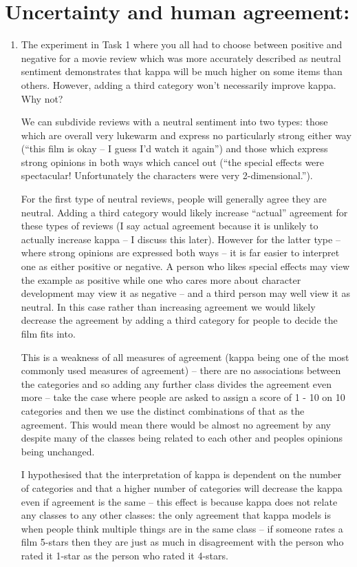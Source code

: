 \documentclass[10pt,\jkfside,a4paper]{article}
\begin{document}
\section*{Uncertainty and human agreement:}

\begin{enumerate}

\item The experiment in Task 1 where you all had to choose between positive
and negative for a movie review which was more accurately described as
neutral sentiment demonstrates that kappa will be much higher on some
items than others. However, adding a third category won’t necessarily
improve kappa. Why not?

We can subdivide reviews with a neutral sentiment into two types: those which are overall 
very lukewarm and express no particularly strong either way (``this film is okay -- I guess 
I'd watch it again'') and those which express strong opinions in both ways which cancel 
out (``the special effects were spectacular! Unfortunately the characters were 
very 2-dimensional.'').

For the first type of neutral reviews, people will generally agree they are neutral. Adding a 
third category would likely increase ``actual'' agreement for these types of reviews (I say 
actual agreement because it is unlikely to actually increase kappa -- I discuss this later). 
However for the latter type -- where strong opinions are expressed both ways -- it is far easier 
to interpret one as either positive or negative. A person who likes special effects may view 
the example as positive while one who cares more about character development may view it 
as negative -- and a third person may well view it as neutral. In this case rather than 
increasing agreement we would likely decrease the agreement by adding a third category for 
people to decide the film fits into.

This is a weakness of all measures of agreement (kappa being one of the most commonly used 
measures of agreement) -- there are no associations between the 
categories and so adding any further class divides the agreement even more -- take the 
case where people are asked to assign a score of 1 - 10 on 10 categories and then we use 
the distinct combinations of that as the agreement. This would mean there would be almost no 
agreement by any despite many of the classes being related to each other and peoples opinions 
being unchanged.

I hypothesised that the interpretation of kappa is dependent on the number of categories 
and that a higher number of categories will decrease the kappa even if agreement is the same 
-- this effect is because kappa does not relate any classes to any other classes: the only 
agreement that kappa models is when people think multiple things are in the same class -- 
if someone rates a film 5-stars then they are just as much in disagreement with the person 
who rated it 1-star as the person who rated it 4-stars.


\end{enumerate}
\end{document}
